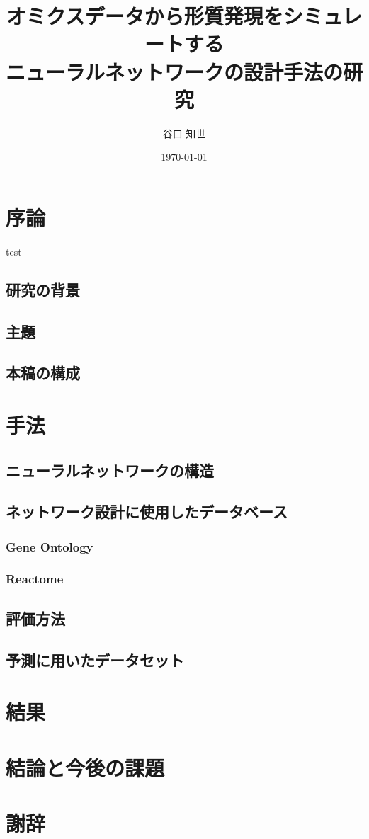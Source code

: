 \documentclass[a4paper,12pt]{jsreport}
\begin{document}
\title{
	オミクスデータから形質発現をシミュレートする\\ニューラルネットワークの設計手法の研究
}
\author{谷口 知世}
\date{\today}
\maketitle
\tableofcontents



\chapter{序論}
test


\section{研究の背景}


\section{主題}


\section{本稿の構成}


\chapter{手法}



\section{ニューラルネットワークの構造}
\section{ネットワーク設計に使用したデータベース}

\subsection{Gene Ontology}
\subsection{Reactome}
\section{評価方法}
\section{予測に用いたデータセット}

\chapter{結果}

\chapter{結論と今後の課題}

\chapter{謝辞}
\end{document}
